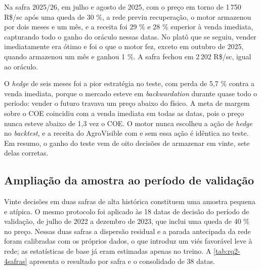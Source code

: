 Na safra 2025/26, em julho e agosto de 2025, com o preço em torno de 1\,750 R\$/sc após uma queda de 30 \%, a rede previu recuperação, o motor armazenou por dois meses e um mês, e a receita foi 29 \% e 28 \% superior à venda imediata, capturando todo o ganho do oráculo nessas datas. No platô que se seguiu, vender imediatamente era ótimo e foi o que o motor fez, exceto em outubro de 2025, quando armazenou um mês e ganhou 1 \%. A safra fechou em 2\,202 R\$/sc, igual ao oráculo.

O \textit{hedge} de seis meses foi a pior estratégia no teste, com perda de 5,7 \% contra a venda imediata, porque o mercado esteve em \textit{backwardation} durante quase todo o período: vender o futuro travava um preço abaixo do físico. A meta de margem sobre o COE coincidiu com a venda imediata em todas as datas, pois o preço nunca esteve abaixo de 1,3 vez o COE. O motor nunca escolheu a ação de \textit{hedge} no \textit{backtest}, e a receita do AgroVisible com e sem essa ação é idêntica no teste. Em resumo, o ganho do teste vem de oito decisões de armazenar em vinte, sete delas corretas.

\subsection{Ampliação da amostra ao período de validação}

Vinte decisões em duas safras de alta histórica constituem uma amostra pequena e atípica. O mesmo protocolo foi aplicado às 18 datas de decisão do período de validação, de julho de 2022 a dezembro de 2023, que inclui uma queda de 40 \% no preço. Nessas duas safras a dispersão residual e a parada antecipada da rede foram calibradas com os próprios dados, o que introduz um viés favorável leve à rede; as estatísticas de base já eram estimadas apenas no treino. A \autoref{tab:rq2-4safras} apresenta o resultado por safra e o consolidado de 38 datas.

